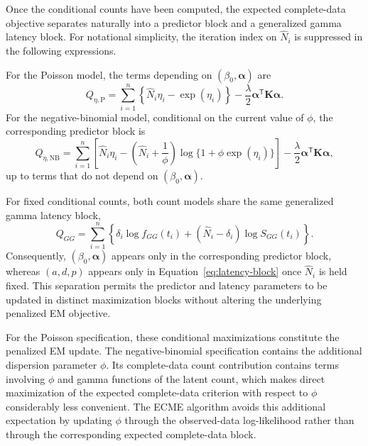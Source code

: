 Once the conditional counts have been computed, the expected
complete-data objective separates naturally into a predictor block and
a generalized gamma latency block. For notational simplicity, the
iteration index on $\widehat N_i$ is suppressed in the following
expressions.

For the Poisson model, the terms depending on
$(\beta_0,\bm{\alpha})$ are
\begin{equation}
    Q_{\eta,\mathrm P}
    =
    \sum_{i=1}^{n}
    \left\{
        \widehat N_i\eta_i
        -
        \exp(\eta_i)
    \right\}
    -
    \frac{\lambda}{2}
    \bm{\alpha}^{\mathsf T}
    \bm K
    \bm{\alpha}.
    \label{eq:poisson-predictor-block}
\end{equation}
For the negative-binomial model, conditional on the current value of
$\phi$, the corresponding predictor block is
\begin{equation}
    Q_{\eta,\mathrm{NB}}
    =
    \sum_{i=1}^{n}
    \left[
        \widehat N_i\eta_i
        -
        \left(
            \widehat N_i+\frac{1}{\phi}
        \right)
        \log\{1+\phi\exp(\eta_i)\}
    \right]
    -
    \frac{\lambda}{2}
    \bm{\alpha}^{\mathsf T}
    \bm K
    \bm{\alpha},
    \label{eq:nb-predictor-block}
\end{equation}
up to terms that do not depend on $(\beta_0,\bm{\alpha})$.

For fixed conditional counts, both count models share the same
generalized gamma latency block,
\begin{equation}
    Q_{GG}
    =
    \sum_{i=1}^{n}
    \left\{
        \delta_i\log f_{GG}(t_i)
        +
        (\widehat N_i-\delta_i)
        \log S_{GG}(t_i)
    \right\}.
    \label{eq:latency-block}
\end{equation}
Consequently, $(\beta_0,\bm{\alpha})$ appears only in the corresponding
predictor block, whereas $(a,d,p)$ appears only in
Equation~\eqref{eq:latency-block} once $\widehat N_i$ is held fixed.
This separation permits the predictor and latency parameters to be
updated in distinct maximization blocks without altering the underlying
penalized EM objective.

For the Poisson specification, these conditional maximizations
constitute the penalized EM update. The negative-binomial specification
contains the additional dispersion parameter $\phi$. Its complete-data
count contribution contains terms involving $\phi$ and gamma functions
of the latent count, which makes direct maximization of the expected
complete-data criterion with respect to $\phi$ considerably less
convenient. The ECME algorithm avoids this additional expectation by
updating $\phi$ through the observed-data log-likelihood rather than
through the corresponding expected complete-data block.

